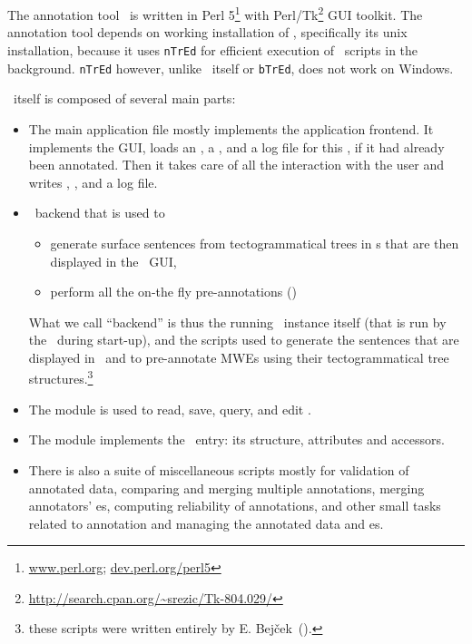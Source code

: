 
\chapter{\seman}
\label{sec:seman}
The annotation tool \seman\ is written in Perl 5\footnote{\url{www.perl.org}; \url{dev.perl.org/perl5}} with Perl/Tk\footnote{\url{http://search.cpan.org/~srezic/Tk-804.029/}} GUI toolkit. The annotation tool depends on working installation of \tred, specifically its unix installation, because it uses \texttt{nTrEd} for efficient execution of \tred\ scripts in the background. \texttt{nTrEd} however, unlike \tred\ itself or \texttt{bTrEd}, does not work on Windows.%

 \seman\ itself is composed of several main parts:
\begin{itemize}
  \item The main application file  mostly implements the application frontend. It implements the GUI, loads an \sf, a \semlex,  and a log file for this \sf, if it had already been annotated. Then it takes care of all the interaction with the user and writes \sf, \semlex, and a log file.
  \item \ntred\ backend that is used to 
	\begin{itemize}
	  \item generate surface sentences from tectogrammatical trees in \tf{}s that are then displayed in the \seman\ GUI,
	  \item perform all the on-the fly pre-annotations ()
	\end{itemize}
	What we call ``backend'' is thus the running \ntred\ instance itself (that is run by the \seman\ during start-up), and the scripts used to generate the sentences that are displayed in \seman\ and to pre-annotate MWEs using their tectogrammatical tree structures.\footnote{these scripts were written entirely by E. Bejček~(\citeyear{bejcek:2010}).}
  \item The module  is used to read, save, query, and edit \semlex.
    \item The module  implements the \semlex\ entry: its structure, attributes and accessors.
  \item There is also a suite of miscellaneous scripts mostly for validation of annotated data, comparing and merging multiple annotations, merging annotators' \semlex{}es, computing reliability of annotations, and other small tasks related to annotation and managing the annotated data and \semlex{}es.
\end{itemize}

